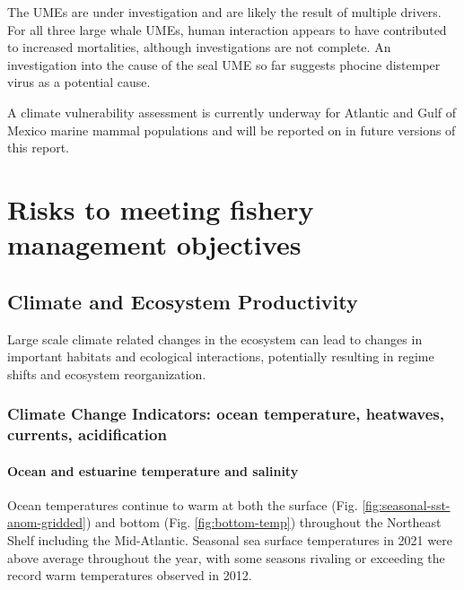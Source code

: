 \documentclass[
  10pt,
]{article}
\begin{document}
The UMEs are under investigation and are likely the result of multiple
drivers. For all three large whale UMEs, human interaction appears to
have contributed to increased mortalities, although investigations are
not complete. An investigation into the cause of the seal UME so far
suggests phocine distemper virus as a potential cause.

A climate vulnerability assessment is currently underway for Atlantic
and Gulf of Mexico marine mammal populations and will be reported on in
future versions of this report.

\hypertarget{risks-to-meeting-fishery-management-objectives}{%
\section{Risks to meeting fishery management
objectives}\label{risks-to-meeting-fishery-management-objectives}}

\hypertarget{climate-and-ecosystem-productivity}{%
\subsection{Climate and Ecosystem
Productivity}\label{climate-and-ecosystem-productivity}}

Large scale climate related changes in the ecosystem can lead to changes
in important habitats and ecological interactions, potentially resulting
in regime shifts and ecosystem reorganization.

\hypertarget{climate-change-indicators-ocean-temperature-heatwaves-currents-acidification}{%
\subsubsection{Climate Change Indicators: ocean temperature, heatwaves,
currents,
acidification}\label{climate-change-indicators-ocean-temperature-heatwaves-currents-acidification}}

\hypertarget{ocean-and-estuarine-temperature-and-salinity}{%
\paragraph{Ocean and estuarine temperature and
salinity}\label{ocean-and-estuarine-temperature-and-salinity}}

Ocean temperatures continue to warm at both the surface (Fig.
\ref{fig:seasonal-sst-anom-gridded}) and bottom (Fig.
\ref{fig:bottom-temp}) throughout the Northeast Shelf including the
Mid-Atlantic. Seasonal sea surface temperatures in 2021 were above
average throughout the year, with some seasons rivaling or exceeding the
record warm temperatures observed in 2012.
\end{document}
